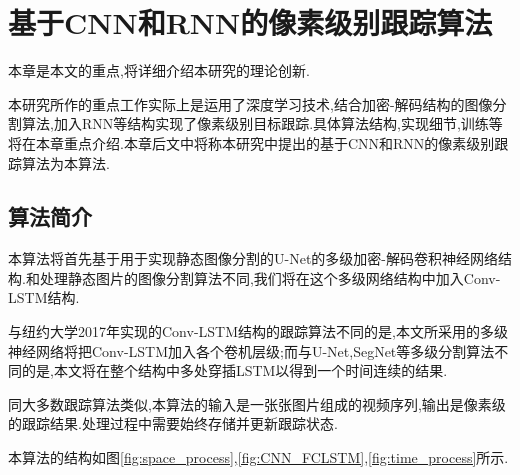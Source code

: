 
\chapter{基于CNN和RNN的像素级别跟踪算法}
本章是本文的重点,将详细介绍本研究的理论创新.
\par
本研究所作的重点工作实际上是运用了深度学习技术,结合加密-解码结构的图像分割算法,加入RNN等结构实现了像素级别目标跟踪.具体算法结构,实现细节,训练等将在本章重点介绍.本章后文中将称本研究中提出的基于CNN和RNN的像素级别跟踪算法为本算法.

\section{算法简介}
本算法将首先基于用于实现静态图像分割的U-Net\supercite{ronneberger2015u}的多级加密-解码卷积神经网络结构.和处理静态图片的图像分割算法不同,我们将在这个多级网络结构中加入Conv-LSTM结构.
\par
与纽约大学2017年实现的Conv-LSTM结构的跟踪算法不同的是,本文所采用的多级神经网络将把Conv-LSTM加入各个卷机层级;而与U-Net,SegNet等多级分割算法不同的是,本文将在整个结构中多处穿插LSTM以得到一个时间连续的结果.
\par
同大多数跟踪算法类似,本算法的输入是一张张图片组成的视频序列,输出是像素级的跟踪结果.处理过程中需要始终存储并更新跟踪状态.
\par
本算法的结构如图\ref{fig:space_process},\ref{fig:CNN_FCLSTM},\ref{fig:time_process}所示.

